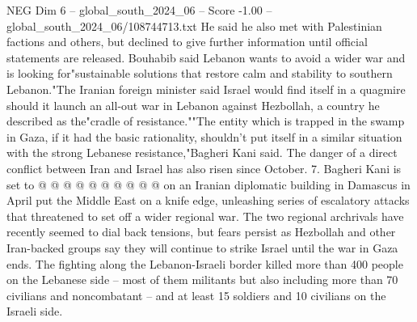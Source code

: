 \begin{textsample}{NEG Dim 6 – global\_south\_2024\_06 – Score -1.00 – global\_south\_2024\_06/108744713.txt}
He said he also met with Palestinian factions and others, but declined to give further information until official statements are released.
Bouhabib said Lebanon wants to avoid a wider war and is looking for"sustainable solutions that restore calm and stability to southern Lebanon."The Iranian foreign minister said Israel would find itself in a quagmire should it launch an all-out war in Lebanon against Hezbollah, a country he described as the"cradle of resistance.""The entity which is trapped in the swamp in Gaza, if it had the basic rationality, shouldn't put itself in a similar situation with the strong Lebanese resistance,"Bagheri Kani said.
The danger of a direct conflict between Iran and Israel has also risen since October. 7.
Bagheri Kani is set to @ @ @ @ @ @ @ @ @ @ on an Iranian diplomatic building in Damascus in April put the Middle East on a knife edge, unleashing series of escalatory attacks that threatened to set off a wider regional war.
The two regional archrivals have recently seemed to dial back tensions, but fears persist as Hezbollah and other Iran-backed groups say they will continue to strike Israel until the war in Gaza ends.
The fighting along the Lebanon-Israeli border killed more than 400 people on the Lebanese side -- most of them militants but also including more than 70 civilians and noncombatant -- and at least 15 soldiers and 10 civilians on the Israeli side.

\end{textsample}
